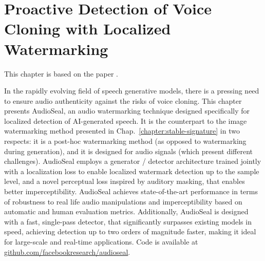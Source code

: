 
\chapter{Proactive Detection of Voice Cloning with Localized Watermarking}\label{chapter:audioseal}

This chapter is based on the paper .

In the rapidly evolving field of speech generative models, there is a pressing need to ensure audio authenticity against the risks of voice cloning. 
This chapter presents AudioSeal, an audio watermarking technique designed specifically for localized detection of AI-generated speech. 
It is the counterpart to the image watermarking method presented in Chap.~\ref{chapter:stable-signature} in two respects: it is a post-hoc watermarking method (as opposed to watermarking during generation), and it is designed for audio signals (which present different challenges).
AudioSeal employs a generator / detector architecture trained jointly with a localization loss to enable localized watermark detection up to the sample level, and a novel perceptual loss inspired by auditory masking, that enables better imperceptibility. 
AudioSeal achieves state-of-the-art performance in terms of robustness to real life audio manipulations and imperceptibility based on automatic and human evaluation metrics. 
Additionally, AudioSeal is designed with a fast, single-pass detector, that significantly surpasses existing models in speed, achieving detection up to two orders of magnitude faster, making it ideal for large-scale and real-time applications.
Code is available at \url{github.com/facebookresearch/audioseal}.

\newpage









